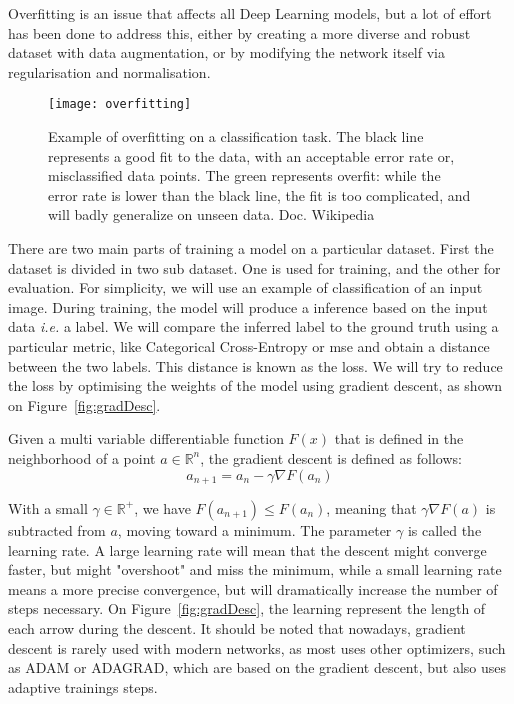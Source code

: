 Overfitting is an issue that affects all Deep Learning models, but a lot of effort has been done to address this, either by creating a more diverse and robust dataset with data augmentation, or by modifying the network itself via regularisation and normalisation. 

\begin{figure}[h!]
  \centering
  \texttt{[image: overfitting]}
	\caption[Example of overfitting on a classification task]{Example of overfitting on a classification task. The black line represents a good fit to the data, with an acceptable error rate or, misclassified data points. The green represents \gls{overfit}: while the error rate is lower than the black line, the fit is too complicated, and will badly generalize on unseen data. Doc. Wikipedia}
  \label{fig:overfit}
\end{figure}

There are two main parts of training a model on a particular dataset. First the dataset is divided in two sub dataset. One is used for training, and the other for evaluation. For simplicity, we will use an example of classification of an input image. During training, the model will produce a inference based on the input data \textit{i.e.} a label. We will compare the inferred label to the ground truth using a particular metric, like Categorical Cross-Entropy or \gls{mse} and obtain a distance between the two labels. This distance is known as the loss. We will try to reduce the loss by optimising the \gls{weights} of the model using gradient descent, as shown on Figure~\ref{fig:gradDesc}. 

Given a multi variable differentiable function $F(x)$ that is defined in the neighborhood of a point $a \in \mathbb{R}^n$, the gradient descent is defined as follows:
\begin{equation}
	a_{n+1} = a_n - \gamma \nabla F(a_n)
\end{equation}

With a small $\gamma \in \mathbb{R}^+$, we have $F(a_{n+1}) \leq F(a_n)$, meaning that $\gamma \nabla F(a)$ is subtracted from $a$, moving toward a minimum. The parameter $\gamma$ is called the learning rate. A large learning rate will mean that the descent might converge faster, but might "overshoot" and miss the minimum, while a small learning rate means a more precise convergence, but will dramatically increase the number of steps necessary. On Figure~\ref{fig:gradDesc}, the learning represent the length of each arrow during the descent. It should be noted that nowadays, gradient descent is rarely used with modern networks, as most uses other optimizers, such as ADAM\cite{AdamOpti} or ADAGRAD\cite{adagrad}, which are based on the gradient descent, but also uses adaptive trainings steps.

